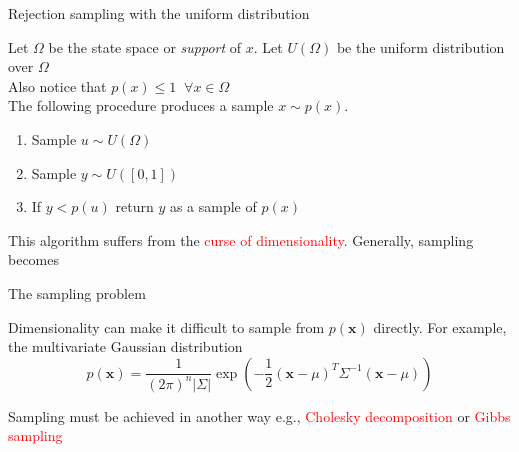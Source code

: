 \documentclass{beamer}					%
\begin{document}
\begin{frame}{Rejection sampling with the uniform distribution}

Let $\Omega$ be the state space or \emph{support} of $x$. Let $U(\Omega)$ be the uniform distribution over $\Omega$\\
\vspace{0.1in}
Also notice that $p(x) \leq 1 \;\;\forall x \in \Omega$\\
\vspace{0.1in}
The following procedure produces a sample $x\sim p(x)$.
\begin{enumerate}
\item Sample $u\sim U(\Omega)$
\item Sample $y\sim U([0,1])$
\item If $y < p(u)$ return $y$ as a sample of $p(x)$
\end{enumerate}
\vspace{0.2in}
This algorithm suffers from the \textcolor{red}{curse of dimensionality}. Generally, sampling becomes 
\end{frame}

\begin{frame}{The sampling problem}

Dimensionality can make it difficult to sample from $p(\mathbf{x})$ directly. For example, the multivariate Gaussian distribution\\

\begin{equation*}
p(\mathbf{x}) = \frac{1}{(2\pi)^{n}|\Sigma|}\exp\left(-\frac{1}{2}(\mathbf{x}-\mu)^{T}\Sigma^{-1}(\mathbf{x}-\mu)\right)
\end{equation*}

Sampling must be achieved in another way e.g., \textcolor{red}{Cholesky decomposition} or \textcolor{red}{Gibbs sampling}


\end{frame}
\end{document}
